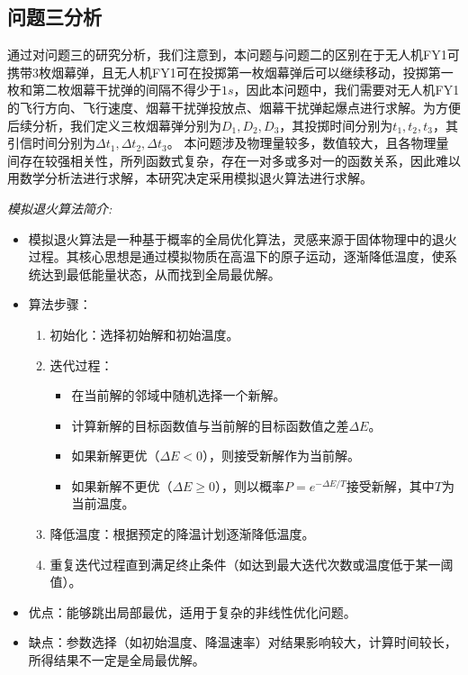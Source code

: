 \documentclass{article}
\begin{document}
\subsection{问题三分析}
通过对问题三的研究分析，我们注意到，本问题与问题二的区别在于无人机FY1可携带3枚烟幕弹，且无人机FY1可在投掷第一枚烟幕弹后可以继续移动，投掷第一枚和第二枚烟幕干扰弹的间隔不得少于$1s$，因此本问题中，我们需要对无人机FY1的飞行方向、飞行速度、烟幕干扰弹投放点、烟幕干扰弹起爆点进行求解。为方便后续分析，我们定义三枚烟幕弹分别为$D_1,D_2,D_3$，其投掷时间分别为$t_1,t_2,t_3$，其引信时间分别为$\Delta t_1,\Delta t_2,\Delta t_3$。
本问题涉及物理量较多，数值较大，且各物理量间存在较强相关性，所列函数式复杂，存在一对多或多对一的函数关系，因此难以用数学分析法进行求解，本研究决定采用模拟退火算法进行求解。

\textit{模拟退火算法简介:}
\begin{itemize}
    \item 模拟退火算法是一种基于概率的全局优化算法，灵感来源于固体物理中的退火过程。其核心思想是通过模拟物质在高温下的原子运动，逐渐降低温度，使系统达到最低能量状态，从而找到全局最优解。
    \item 算法步骤：
    \begin{enumerate}
        \item 初始化：选择初始解和初始温度。
        \item 迭代过程：
        \begin{itemize}
            \item 在当前解的邻域中随机选择一个新解。
            \item 计算新解的目标函数值与当前解的目标函数值之差$\Delta E$。
            \item 如果新解更优（$\Delta E < 0$），则接受新解作为当前解。
            \item 如果新解不更优（$\Delta E \geq 0$），则以概率$P = e^{-\Delta E / T}$接受新解，其中$T$为当前温度。
        \end{itemize}
        \item 降低温度：根据预定的降温计划逐渐降低温度。
        \item 重复迭代过程直到满足终止条件（如达到最大迭代次数或温度低于某一阈值）。
    \end{enumerate}
    \item 优点：能够跳出局部最优，适用于复杂的非线性优化问题。
    \item 缺点：参数选择（如初始温度、降温速率）对结果影响较大，计算时间较长，所得结果不一定是全局最优解。
\end{itemize}
\end{document}
